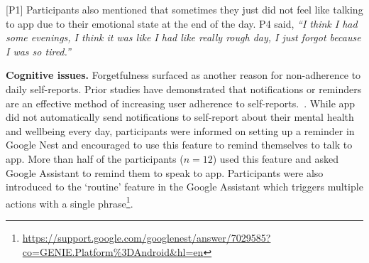                 [P1]
        Participants also mentioned  that sometimes they just did not feel like talking to \acl{app} due to their emotional state at the end of the day. P4 said,
                \textit{
                ``I think I had some evenings, I think it was like I had like really rough day, I just forgot because I was so tired.''
                }
        
         
        \textbf{Cognitive issues. }
        Forgetfulness surfaced as another reason for non-adherence to daily self-reports. Prior studies have demonstrated that notifications or reminders are an effective method of increasing user adherence to self-reports.~\cite{moller2013investigating, hofmann2015surveysignal}. While \acl{app} did not automatically send notifications to self-report about their mental health and wellbeing every day, participants were informed on setting up a reminder in Google Nest and encouraged to use this feature to remind themselves to talk to \acl{app}. More than half of the participants ($n=12$) used this feature and asked Google Assistant to remind them to speak to \acl{app}.
        Participants were also introduced to the `routine' feature in the Google Assistant which triggers multiple actions with a single phrase\footnote{\url{https://support.google.com/googlenest/answer/7029585?co=GENIE.Platform\%3DAndroid&hl=en}}. 
        
